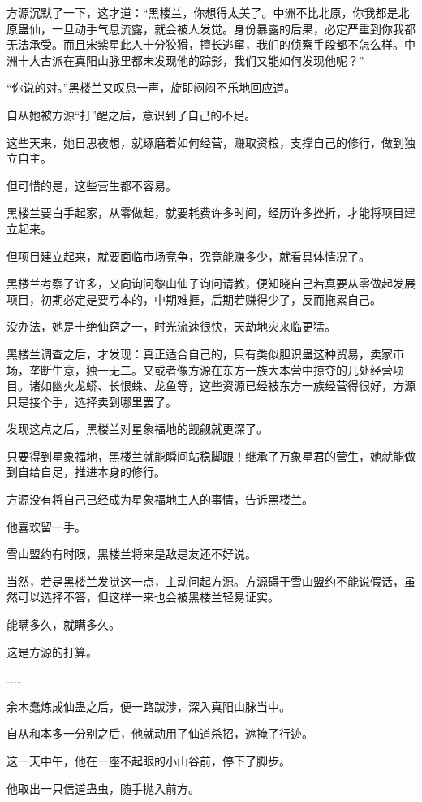 \begin{this_body}
方源沉默了一下，这才道：“黑楼兰，你想得太美了。中洲不比北原，你我都是北原蛊仙，一旦动手气息流露，就会被人发觉。身份暴露的后果，必定严重到你我都无法承受。而且宋紫星此人十分狡猾，擅长逃窜，我们的侦察手段都不怎么样。中洲十大古派在真阳山脉里都未发现他的踪影，我们又能如何发现他呢？”

“你说的对。”黑楼兰又叹息一声，旋即闷闷不乐地回应道。

自从她被方源“打”醒之后，意识到了自己的不足。

这些天来，她日思夜想，就琢磨着如何经营，赚取资粮，支撑自己的修行，做到独立自主。

但可惜的是，这些营生都不容易。

黑楼兰要白手起家，从零做起，就要耗费许多时间，经历许多挫折，才能将项目建立起来。

但项目建立起来，就要面临市场竞争，究竟能赚多少，就看具体情况了。

黑楼兰考察了许多，又向询问黎山仙子询问请教，便知晓自己若真要从零做起发展项目，初期必定是要亏本的，中期难捱，后期若赚得少了，反而拖累自己。

没办法，她是十绝仙窍之一，时光流速很快，天劫地灾来临更猛。

黑楼兰调查之后，才发现：真正适合自己的，只有类似胆识蛊这种贸易，卖家市场，垄断生意，独一无二。又或者像方源在东方一族大本营中掠夺的几处经营项目。诸如幽火龙蟒、长恨蛛、龙鱼等，这些资源已经被东方一族经营得很好，方源只是接个手，选择卖到哪里罢了。

发现这点之后，黑楼兰对星象福地的觊觎就更深了。

只要得到星象福地，黑楼兰就能瞬间站稳脚跟！继承了万象星君的营生，她就能做到自给自足，推进本身的修行。

方源没有将自己已经成为星象福地主人的事情，告诉黑楼兰。

他喜欢留一手。

雪山盟约有时限，黑楼兰将来是敌是友还不好说。

当然，若是黑楼兰发觉这一点，主动问起方源。方源碍于雪山盟约不能说假话，虽然可以选择不答，但这样一来也会被黑楼兰轻易证实。

能瞒多久，就瞒多久。

这是方源的打算。

……

余木蠢炼成仙蛊之后，便一路跋涉，深入真阳山脉当中。

自从和本多一分别之后，他就动用了仙道杀招，遮掩了行迹。

这一天中午，他在一座不起眼的小山谷前，停下了脚步。

他取出一只信道蛊虫，随手抛入前方。


\end{this_body}
